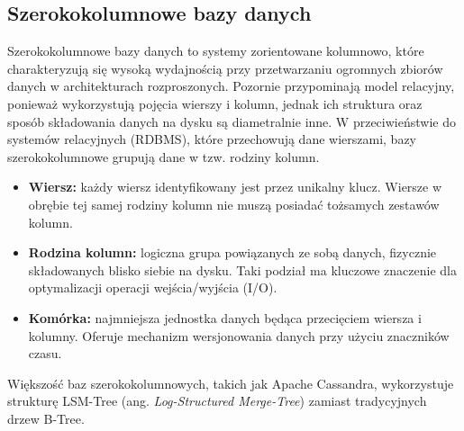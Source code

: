\subsection{Szerokokolumnowe bazy danych}
Szerokokolumnowe bazy danych to systemy zorientowane kolumnowo, które charakteryzują się wysoką wydajnością przy przetwarzaniu ogromnych zbiorów danych w architekturach rozproszonych. Pozornie przypominają model relacyjny, ponieważ wykorzystują pojęcia wierszy i kolumn, jednak ich struktura oraz sposób składowania danych na dysku są diametralnie inne. W przeciwieństwie do systemów relacyjnych (RDBMS), które przechowują dane wierszami, bazy szerokokolumnowe grupują dane w tzw. rodziny kolumn.
\begin{itemize}
    \item \textbf{Wiersz:} każdy wiersz identyfikowany jest przez unikalny klucz. Wiersze w obrębie tej samej rodziny kolumn nie muszą posiadać tożsamych zestawów kolumn.
    \item \textbf{Rodzina kolumn:} logiczna grupa powiązanych ze sobą danych, fizycznie składowanych blisko siebie na dysku. Taki podział ma kluczowe znaczenie dla optymalizacji operacji wejścia/wyjścia (I/O).
    \item \textbf{Komórka:} najmniejsza jednostka danych będąca przecięciem wiersza i kolumny. Oferuje mechanizm wersjonowania danych przy użyciu znaczników czasu.
\end{itemize}
Większość baz szerokokolumnowych, takich jak Apache Cassandra, wykorzystuje strukturę LSM-Tree (ang. \emph{Log-Structured Merge-Tree}) zamiast tradycyjnych drzew B-Tree.
